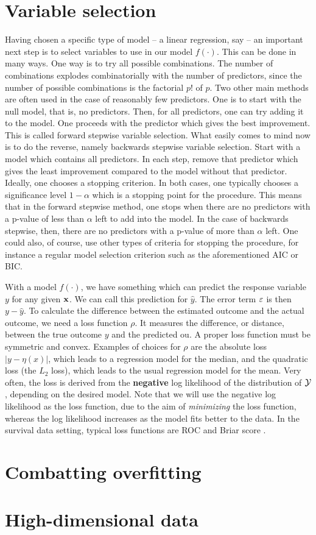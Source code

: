 \section{Variable selection}
Having chosen a specific type of model -- a linear regression, say -- an important next step is to select variables to use in our model $f(\cdot)$. This can be done in many ways. One way is to try all possible combinations. The number of combinations explodes combinatorially with the number of predictors, since the number of possible combinations is the factorial $p!$ of $p$. Two other main methods are often used in the case of reasonably few predictors. One is to start with the null model, that is, no predictors. Then, for all predictors, one can try adding it to the model. One proceeds with the predictor which gives the best improvement. This is called forward stepwise variable selection. What easily comes to mind now is to do the reverse, namely backwards stepwise variable selection. Start with a model which contains all predictors. In each step, remove that predictor which gives the least improvement compared to the model without that predictor. Ideally, one chooses a stopping criterion. In both cases, one typically chooses a significance level $1-\alpha$ which is a stopping point for the procedure. This means that in the forward stepwise method, one stops when there are no predictors with a p-value of less than $\alpha$ left to add into the model. In the case of backwards stepwise, then, there are no predictors with a p-value of more than $\alpha$ left. One could also, of course, use other types of criteria for stopping the procedure, for instance a regular model selection criterion such as the aforementioned AIC or BIC.

With a model $f(\cdot)$, we have something which can predict the response variable $y$ for any given $\mathbf{x}$. We can call this prediction for $\hat{y}$. The error term $\varepsilon$ is then $y-\hat{y}$. To calculate the difference between the estimated outcome and the actual outcome, we need a loss function $\rho$. It measures the difference, or distance, between the true outcome $y$ and the predicted ou. A proper loss function must be symmetric and convex. Examples of choices for $\rho$ are the absolute loss $|y-\eta(x)|$, which leads to a regression model for the median, and the quadratic loss (the $L_2$ loss), which leads to the usual regression model for the mean. Very often, the loss is derived from the \textbf{negative} log likelihood of the distribution of $\mathcal{Y}$, depending on the desired model. Note that we will use the negative log likelihood as the loss function, due to the aim of \textit{minimizing} the loss function, whereas the log likelihood increases as the model fits better to the data. In the survival data setting, typical loss functions are ROC and Briar score \citep{bovelstadborgan}.

\section{Combatting overfitting}

\section{High-dimensional data}